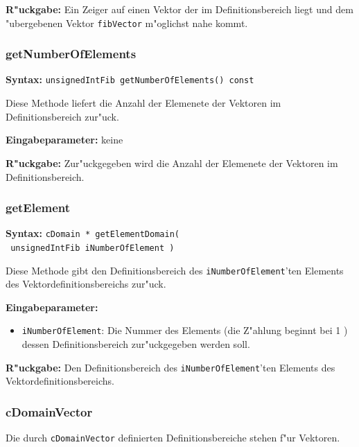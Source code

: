 \bigskip\noindent
\textbf{R"uckgabe:} Ein Zeiger auf einen Vektor der im Definitionsbereich liegt und dem "ubergebenen Vektor \verb|fibVector| m"oglichst nahe kommt.


\subsubsection{getNumberOfElements}

\textbf{Syntax:} \verb|unsignedIntFib getNumberOfElements() const|

\bigskip\noindent
Diese Methode liefert die Anzahl der Elemenete der Vektoren im Definitionsbereich zur"uck.

\bigskip\noindent
\textbf{Eingabeparameter:} keine

\bigskip\noindent
\textbf{R"uckgabe:} Zur"uckgegeben wird die Anzahl der Elemenete der Vektoren im Definitionsbereich.


\subsubsection{getElement}

\textbf{Syntax:} \verb|cDomain * getElementDomain(| \\\verb| unsignedIntFib iNumberOfElement )|

\bigskip\noindent
Diese Methode gibt den Definitionsbereich des \verb|iNumberOfElement|'ten Elements des Vektordefinitionsbereichs zur"uck.

\bigskip\noindent
\textbf{Eingabeparameter:}
\begin{itemize}
 \item \verb|iNumberOfElement|: Die Nummer des Elements (die Z"ahlung beginnt bei 1 ) dessen Definitionsbereich zur"uckgegeben werden soll.
\end{itemize}

\bigskip\noindent
\textbf{R"uckgabe:} Den Definitionsbereich des \verb|iNumberOfElement|'ten Elements des Vektordefinitionsbereichs.


\subsubsection{cDomainVector}

Die durch \verb|cDomainVector| definierten Definitionsbereiche stehen f"ur Vektoren.

